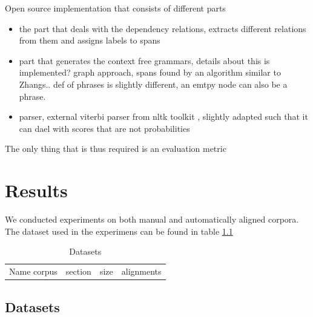 \documentclass{report}
\theoremstyle{definition}
\theoremstyle{plain}
\begin{document}
Open source implementation that consists of different parts

\begin{itemize}
\item the part that deals with the dependency relations, extracts different relations from them and assigns labels to spans
\item part that generates the context free grammars, details about this is implemented? graph approach, spans found by an algorithm similar to Zhangs.. def of phrases is slightly different, an emtpy node can also be a phrase.
\item parser, external viterbi parser from nltk toolkit \citep{bird2009natural}, slightly adapted such that it can dael with scores that are not probabilities 
\end{itemize}

The only thing that is thus required is an evaluation metric


\chapter{Results}


We conducted experiments on both manual and automatically aligned corpora. The dataset used in the experimens can be found in table \ref{table:datasets}

\begin{table}\label{table:datasets}
\begin{tabular}{cccc}
Name corpus & section & size & alignments\\
\end{tabular}
\caption{Datasets}
\end{table}

\section{Datasets}
\end{document}
